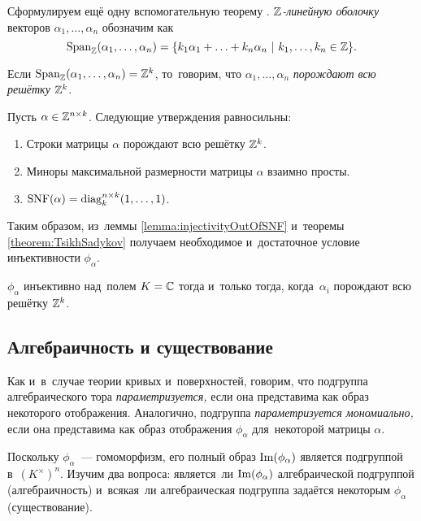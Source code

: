 Сформулируем ещё одну вспомогательную теорему \cite{TsikhSad14}.
\textit{$\mathbb{Z}$-линейную оболочку} векторов $\alpha_1, \ldots, \alpha_n$ обозначим как
\[
  \mathrm{Span}_{\mathbb{Z}}(\alpha_1, \ldots, \alpha_n) = \{ k_1 \alpha_1 + \ldots + k_n \alpha_n \ | \ k_1, \ldots, k_n \in \mathbb{Z} \}.
\]

Если $\mathrm{Span}_{\mathbb{Z}}(\alpha_1, \ldots, \alpha_n) = \mathbb{Z}^k$, то~говорим, что $\alpha_1, \ldots, \alpha_n$ \textit{порождают всю решётку} $\mathbb{Z}^k$.

\begin{theorem}
\label{theorem:TsikhSadykov}
  Пусть $\alpha \in \mathbb{Z}^{n \times k}$. Следующие утверждения равносильны:
  \begin{enumerate}
    \item Строки матрицы $\alpha$ порождают всю решётку $\mathbb{Z}^k$.
    \item Миноры максимальной размерности матрицы $\alpha$ взаимно просты.
    \item $\mathrm{SNF}(\alpha) = \mathrm{diag}^{n \times k}_k(1, \ldots, 1)$.
  \end{enumerate}
\end{theorem}

Таким образом, из~леммы \ref{lemma:injectivityOutOfSNF} и~теоремы \ref{theorem:TsikhSadykov}
получаем необходимое и~достаточное условие инъективности $\phi_\alpha$.

\begin{theorem}
\label{theorem:InjectivityCondition}
  $\phi_\alpha$ инъективно над~полем $K = \mathbb{C}$ тогда и~только тогда, когда~$\alpha_i$ порождают всю решётку $\mathbb{Z}^k$.
\end{theorem}

\subsection{Алгебраичность и существование}
Как и~в~случае теории кривых и~поверхностей, говорим, что подгруппа алгебраического тора \textit{параметризуется,}
если она представима как образ некоторого отображения. Аналогично, подгруппа \textit{параметризуется мономиально,}
если она представима как образ отображения $\phi_\alpha$ для~некоторой матрицы $\alpha$.

Поскольку $\phi_\alpha$~— гомоморфизм, его полный образ $\mathrm{Im}(\phi_\alpha)$ является подгруппой в~$(K^\times)^n$.
Изучим два вопроса: является~ли $\mathrm{Im}(\phi_\alpha)$ алгебраической подгруппой (алгебраичность) и~всякая~ли алгебраическая подгруппа задаётся некоторым $\phi_\alpha$ (существование).


